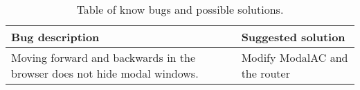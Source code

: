 \begin{table}[H]
\centering
\begin{tabular}{|p{5.5cm} | p{5.5cm}|}
	\hline
	Bug description & Suggested solution \\ \hline
	Moving forward and backwards in the browser does not hide modal windows. & Modify ModalAC and the router \\ \hline
\end{tabular}

\caption{\label{web_limitations} Table of know bugs and possible solutions.}
\end{table}
